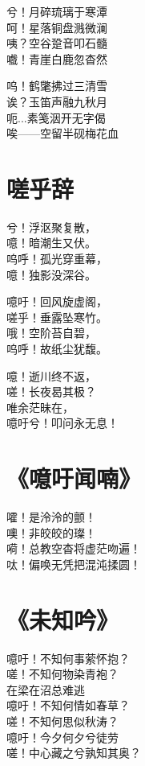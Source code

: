 兮！月碎琉璃于寒潭 \\
呵！星落铜盘溅微澜 \\
咦？空谷跫音叩石髓 \\
嚱！青崖白鹿忽杳然
\vspace{1em}

呜！鹤氅拂过三清雪 \\
诶？玉笛声融九秋月 \\
呃...素笺洇开无字偈 \\
唉——空留半砚梅花血

\clearpage


\section{ 嗟乎辞}

兮！浮沤聚复散， \\
噫！暗潮生又伏。 \\
呜呼！孤光穿重幕， \\
噫！独影没深谷。
\vspace{1em}

噫吁！回风旋虚阁， \\
嗟乎！垂露坠寒竹。 \\
哦！空阶苔自碧， \\
呜呼！故纸尘犹馥。
\vspace{1em}

噫！逝川终不返， \\
嗟！长夜曷其极？ \\
唯余茫昧在， \\
噫吁兮！叩问永无息！

\clearpage


\section{《噫吁闻喃》}

嚯！是泠泠的颤！ \\
噢！非皎皎的璨！ \\
嗬！总教空杳将虚茫吻遍！ \\
呔！偏唤无凭把混沌揉圆！

\clearpage


\section{《未知吟》}

噫吁！不知何事萦怀抱？ \\
嗟！不知何物染青袍？ \\
在梁在沼总难逃 \\
噫吁！不知何情如春草？ \\
嗟！不知何思似秋涛？ \\
噫吁！今夕何夕兮徒劳 \\
嗟！中心藏之兮孰知其奥？

